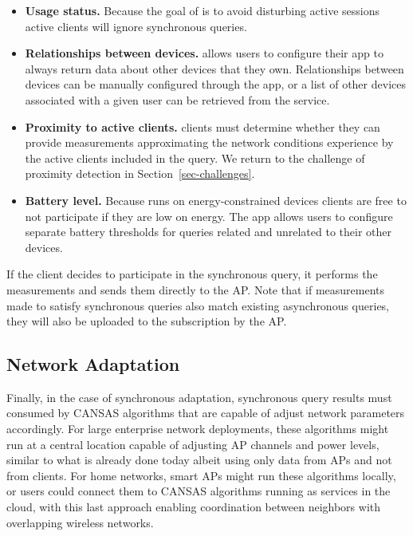 \vspace*{-0.05in}
\begin{itemize}

\item \textbf{Usage status.} Because the goal of \PS{} is to avoid disturbing
active sessions active clients will ignore synchronous queries.

\item \textbf{Relationships between devices.} \PS{} allows users to
configure their app to always return data about other devices that they own.
Relationships between devices can be manually configured through the app,
or a list of other devices associated with a given user can be retrieved from
the \PS{} service.

\item \textbf{Proximity to active clients.} \PS{} clients must determine
whether they can provide measurements approximating the network conditions
experience by the active clients included in the query. We return to the
challenge of proximity detection in Section~\ref{sec-challenges}.

\item \textbf{Battery level.} Because \PS{} runs on energy-constrained
  devices clients are free to not participate if they are low on energy. The
  \PS{} app allows users to configure separate battery thresholds for queries
  related and unrelated to their other devices.

\end{itemize}
\vspace*{-0.05in}
If the client decides to participate in the synchronous query, it performs
the measurements and sends them directly to the AP. Note that if measurements
made to satisfy synchronous queries also match existing asynchronous queries,
they will also be uploaded to the \PS{} subscription by the AP.

\subsection{Network Adaptation}

Finally, in the case of synchronous adaptation, synchronous query results must
consumed by CANSAS algorithms that are capable of adjust network parameters
accordingly. For large enterprise network deployments, these algorithms might
run at a central location capable of adjusting AP channels and power levels,
similar to what is already done today albeit using only data from APs and not
from clients. For home networks, smart \PS{} APs might run these algorithms
locally, or users could connect them to CANSAS algorithms running as services
in the cloud, with this last approach enabling coordination between neighbors
with overlapping wireless networks.
